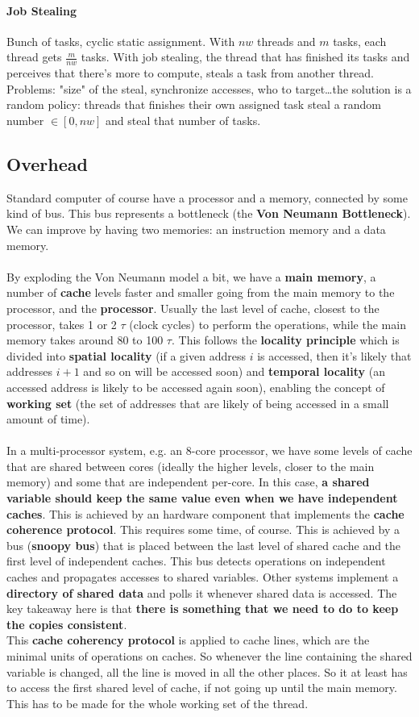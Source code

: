 \documentclass[10pt]{report}
\begin{document}
\paragraph{Job Stealing} Bunch of tasks, cyclic static assignment. With $nw$ threads and $m$ tasks, each thread gets $\frac{m}{nw}$ tasks. With job stealing, the thread that has finished its tasks and perceives that there's more to compute, steals a task from another thread. Problems: "size" of the steal, synchronize accesses, who to target\ldots the solution is a random policy: threads that finishes their own assigned task steal a random number $\in[0, nw]$ and steal that number of tasks.
\subsection{Overhead}
Standard computer of course have a processor and a memory, connected by some kind of bus. This bus represents a bottleneck (the \textbf{Von Neumann Bottleneck}). We can improve by having two memories: an instruction memory and a data memory.\\\\
By exploding the Von Neumann model a bit, we have a \textbf{main memory}, a number of \textbf{cache} levels faster and smaller going from the main memory to the processor, and the \textbf{processor}. Usually the last level of cache, closest to the processor, takes 1 or 2 $\tau$ (clock cycles) to perform the operations, while the main memory takes around 80 to 100 $\tau$. This follows the \textbf{locality principle} which is divided into \textbf{spatial locality} (if a given address $i$ is accessed, then it's likely that addresses $i+1$ and so on will be accessed soon)  and \textbf{temporal locality} (an accessed address is likely to be accessed again soon), enabling the concept of \textbf{working set} (the set of addresses that are likely of being accessed in a small amount of time).\\\\
In a multi-processor system, e.g. an 8-core processor, we have some levels of cache that are shared between cores (ideally the higher levels, closer to the main memory) and some that are independent per-core. In this case, \textbf{a shared variable should keep the same value even when we have independent caches}. This is achieved by an hardware component that implements the \textbf{cache coherence protocol}. This requires some time, of course. This is achieved by a bus (\textbf{snoopy bus}) that is placed between the last level of shared cache and the first level of independent caches. This bus detects operations on independent caches and propagates accesses to shared variables. Other systems implement a \textbf{directory of shared data} and polls it whenever shared data is accessed. The key takeaway here is that \textbf{there is something that we need to do to keep the copies consistent}.\\
This \textbf{cache coherency protocol} is applied to cache lines, which are the minimal units of operations on caches. So whenever the line containing the shared variable is changed, all the line is moved in all the other places. So it at least has to access the first shared level of cache, if not going up until the main memory. This has to be made for the whole working set of the thread.
\end{document}
